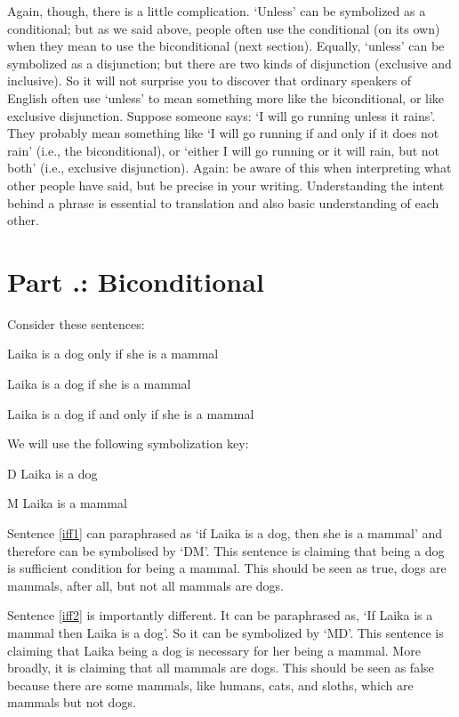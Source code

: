 
Again, though, there is a little complication. ‘Unless’ can be symbolized as a conditional; but as we said above, people often use the conditional (on its own) when they mean to use the biconditional (next section). Equally, ‘unless’ can be symbolized as a disjunction; but there are two kinds of disjunction (exclusive and inclusive). So it will not surprise you to discover that ordinary speakers of English often use ‘unless’ to mean something more like the biconditional, or like exclusive disjunction. Suppose someone says: ‘I will go running unless it rains’. They probably mean something like ‘I will go running if and only if it does not rain’ (i.e., the biconditional), or ‘either I will go running or it will rain, but not both’ (i.e., exclusive disjunction). Again: be aware of this when interpreting what other people have said, but be precise in your writing. Understanding the intent behind a phrase is essential to translation and also basic understanding of each other. 

\section{Part \thechapcount.\theseccount: Biconditional}
Consider these sentences:
	\begin{earg}
		\item[\ex{iff1}] Laika is a dog only if she is a mammal
		\item[\ex{iff2}] Laika is a dog if she is a mammal
		\item[\ex{iff3}] Laika is a dog if and only if she is a mammal
	\end{earg}
We will use the following symbolization key:
	\begin{ekey}
		\item[D] Laika is a dog
		\item[M] Laika is a mammal
	\end{ekey}
Sentence \ref{iff1} can paraphrased as `if Laika is a dog, then she is a mammal' and therefore can be symbolised by ‘D\eif M’. This sentence is claiming that being a dog is sufficient condition for being a mammal. This should be seen as true, dogs are mammals, after all, but not all mammals are dogs. 

Sentence \ref{iff2} is importantly different. It can be paraphrased as, ‘If Laika is a mammal then Laika is a dog’. So it can be symbolized by ‘M\eif D’. This sentence is claiming that Laika being a dog is necessary for her being a mammal. More broadly, it is claiming that all mammals are dogs. This should be seen as false because there are some mammals, like humans, cats, and sloths, which are mammals but not dogs. 

